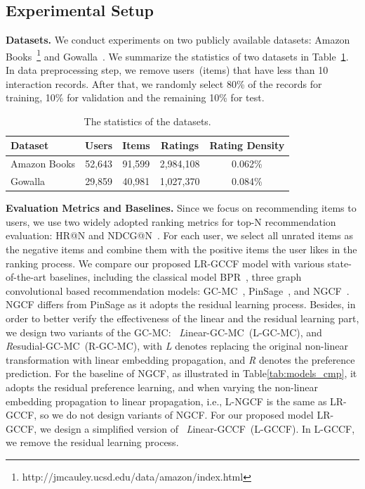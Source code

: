 \documentclass[letterpaper]{article} %
\begin{document}
\subsection{Experimental Setup}

\textbf{Datasets.}
We conduct experiments on two publicly available datasets: Amazon Books~\footnote{http://jmcauley.ucsd.edu/data/amazon/index.html} and Gowalla~\cite{liang2016modeling}. We summarize the statistics of two datasets in Table~\ref{tab:data_stats}. In data preprocessing step, we remove users~(items) that have less than 10 interaction records. After that, we randomly select 80\% of the records for training, 10\% for validation and the remaining 10\% for test.

\begin{table}[htb] \centering
\caption{\small{The statistics of the datasets.}}\label{tab:data_stats}
\begin{scriptsize}
\begin{tabular}{|l|c|c|c|c|}
\hline
Dataset  & Users  & Items  &Ratings  & Rating Density \\ \hline
Amazon Books &  52,643 & 91,599 & 2,984,108  & 0.062\%  \\  \hline
Gowalla  &29,859 & 40,981 & 1,027,370& 0.084\%\\  \hline
\end{tabular}
\end{scriptsize}
\end{table}



\textbf{Evaluation Metrics and Baselines.}
Since we focus on recommending items to users, we use two widely adopted ranking metrics for top-N recommendation evaluation: HR@N and NDCG@N~\cite{chen2017attentive}. For each user, we select all unrated items as the negative items and combine them with the positive items the user likes in the ranking process. We compare our proposed LR-GCCF model with various state-of-the-art baselines, including the classical model BPR~\cite{UAI2009bpr}, three graph convolutional based recommendation models: GC-MC~\cite{ICLR2017graph}, PinSage~\cite{kdd2018Pinsage}, and NGCF~\cite{sigir2019ngcf}. NGCF differs from PinSage as it adopts the residual learning process.
Besides, in order to better verify the effectiveness of the linear and the residual learning part, we design two variants of the GC-MC: ~\emph{L}inear-GC-MC~(L-GC-MC), and \emph{R}esudial-GC-MC~(R-GC-MC), with \emph{L} denotes replacing the original non-linear transformation with linear embedding propagation, and \emph{R} denotes the preference prediction. For the baseline of NGCF, as illustrated in  Table\ref{tab:models_cmp}, it adopts the residual preference learning, and when varying the non-linear embedding propagation to linear propagation, i.e., L-NGCF is the same as LR-GCCF, so we do not design variants of NGCF. For our proposed model LR-GCCF, we design a simplified version of ~\emph{L}inear-GCCF~(L-GCCF). In L-GCCF, we remove the residual learning process.
\end{document}
